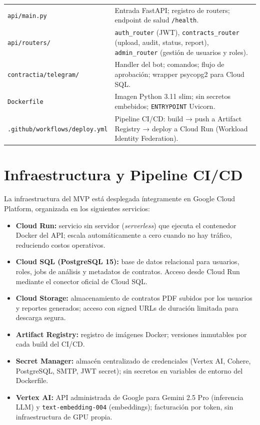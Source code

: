 \begin{longtable}{p{5cm} p{9cm}}
\texttt{api/main.py} &
    Entrada FastAPI; registro de routers;
    endpoint de salud \texttt{/health}. \\[6pt]
\texttt{api/routers/} &
    \texttt{auth\_router} (JWT), \texttt{contracts\_router}
    (upload, audit, status, report), \texttt{admin\_router}
    (gestión de usuarios y roles). \\[6pt]
\texttt{contractia/telegram/} &
    Handler del bot; comandos; flujo de aprobación;
    wrapper psycopg2 para Cloud SQL. \\[6pt]
\texttt{Dockerfile} &
    Imagen Python 3.11 slim; sin secretos embebidos;
    \texttt{ENTRYPOINT} Uvicorn. \\[6pt]
\texttt{.github/workflows/deploy.yml} &
    Pipeline CI/CD: build → push a Artifact Registry →
    deploy a Cloud Run (Workload Identity Federation). \\
\end{longtable}

\section{Infraestructura y Pipeline CI/CD}

La infraestructura del MVP está desplegada íntegramente en Google Cloud
Platform, organizada en los siguientes servicios:

\begin{itemize}
    \item \textbf{Cloud Run:} servicio sin servidor (\textit{serverless})
    que ejecuta el contenedor Docker del API; escala automáticamente a
    cero cuando no hay tráfico, reduciendo costos operativos.
    \item \textbf{Cloud SQL (PostgreSQL 15):} base de datos relacional
    para usuarios, roles, jobs de análisis y metadatos de contratos.
    Acceso desde Cloud Run mediante el conector oficial de Cloud SQL.
    \item \textbf{Cloud Storage:} almacenamiento de contratos PDF subidos
    por los usuarios y reportes generados; acceso con signed URLs de
    duración limitada para descarga segura.
    \item \textbf{Artifact Registry:} registro de imágenes Docker;
    versiones inmutables por cada build del CI/CD.
    \item \textbf{Secret Manager:} almacén centralizado de credenciales
    (Vertex AI, Cohere, PostgreSQL, SMTP, JWT secret); sin secretos
    en variables de entorno del Dockerfile.
    \item \textbf{Vertex AI:} API administrada de Google para Gemini 2.5
    Pro (inferencia LLM) y \texttt{text-embedding-004} (embeddings);
    facturación por token, sin infraestructura de GPU propia.
\end{itemize}


